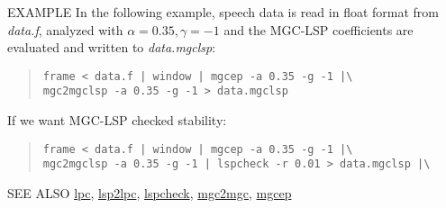 \begin{qsection}{EXAMPLE}
In the following example, speech data is read in float format from
{\em data.f}, analyzed with $\alpha = 0.35, \gamma = -1$
and the MGC-LSP coefficients are evaluated and written to {\em data.mgclsp}:
\begin{quote}
\verb!frame < data.f | window | mgcep -a 0.35 -g -1 |\!\\
\verb!mgc2mgclsp -a 0.35 -g -1 > data.mgclsp!
\end{quote}
If we want MGC-LSP checked stability:
\begin{quote}
\verb!frame < data.f | window | mgcep -a 0.35 -g -1 |\!\\
\verb!mgc2mgclsp -a 0.35 -g -1 | lspcheck -r 0.01 > data.mgclsp |\! \\
\end{quote}
\end{qsection}

\begin{qsection}{SEE ALSO}
\hyperlink{lpc}{lpc},
\hyperlink{lsp2lpc}{lsp2lpc},
\hyperlink{lspcheck}{lspcheck},
\hyperlink{mgc2mgc}{mgc2mgc},
\hyperlink{mgcep}{mgcep}
\end{qsection}
